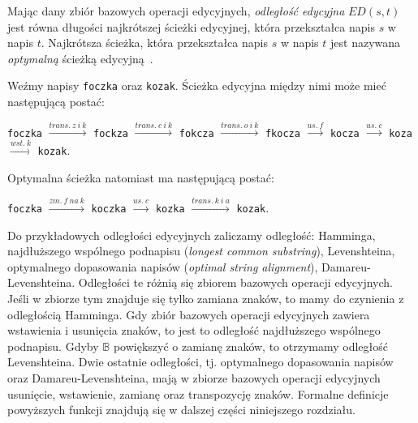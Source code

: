 \documentclass{praca1}
\begin{document}
\begin{definition}
Mając dany zbiór bazowych operacji edycyjnych, \emph{odległość edycyjna} $ED(s,t)$ jest równa długości najkrótszej ścieżki edycyjnej, która przekształca napis $s$ w napis $t$. Najkrótsza ścieżka, która przekształca napis $s$ w napis $t$ jest nazywana \emph{optymalną} ścieżką edycyjną~\cite{Boytsov2011:indexingmethods}. 
\end{definition}

\begin{example}
Weźmy napisy \verb|foczka| oraz \verb|kozak|. Ścieżka edycyjna między nimi może mieć następującą postać:

\verb|foczka|  $\xrightarrow{trans.\ z\ i\ k}$ \verb|fockza| $\xrightarrow{trans.\ c\ i\ k}$ \verb|fokcza| $\xrightarrow{trans.\ o\ i\ k}$ \verb|fkocza| $\xrightarrow{us.\ f}$ \verb|kocza| $\xrightarrow{us.\ c}$ \verb|koza| $\xrightarrow{wst.\ k}$ \verb|kozak|.

Optymalna ścieżka natomiast ma następującą postać:

\verb|foczka| $\xrightarrow{zm.\ f\ na\ k}$ \verb|koczka|  $\xrightarrow{us.\ c}$ \verb|kozka| $\xrightarrow{trans.\ k\ i\ a}$ \verb|kozak|.

\end{example}

Do przykładowych odległości edycyjnych zaliczamy odległość: Hamminga, najdłuższego wspólnego podnapisu (\emph{longest common substring}), Levenshteina, optymalnego dopasowania napisów (\emph{optimal string alignment}), Damareu-Levenshteina. Odległości te różnią się zbiorem bazowych operacji edycyjnych. Jeśli w zbiorze tym znajduje się tylko zamiana znaków, to mamy do czynienia z odległością Hamminga. Gdy zbiór bazowych operacji edycyjnych zawiera wstawienia i usunięcia znaków, to jest to odległość najdłuższego wspólnego podnapisu. Gdyby $\mathbb{B}$ powiększyć o zamianę znaków, to otrzymamy odległość Levenshteina. Dwie ostatnie odległości, tj. optymalnego dopasowania napisów oraz Damareu-Levenshteina, mają w zbiorze bazowych operacji edycyjnych usunięcie, wstawienie, zamianę oraz transpozycję znaków. Formalne definicje powyższych funkcji znajdują się w dalszej części niniejszego rozdziału.
\end{document}

